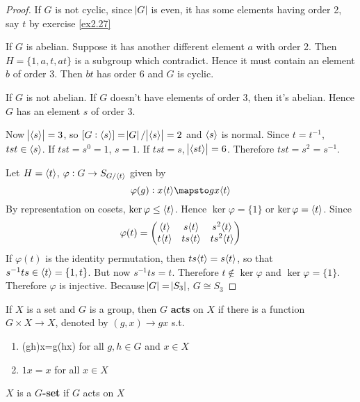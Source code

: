 \documentclass[11pt]{article}
\begin{document}
\begin{proof}


If \(G\) is not cyclic, since \(\abs{G}\) is even, it has some elements having
order 2, say \(t\) by exercise \ref{ex2.27}

If \(G\) is abelian. Suppose it has another different element \(a\) with order 2.
Then \(H=\{1,a,t,at\}\) is a subgroup which contradict. Hence it must contain
an element \(b\) of order 3. Then \(bt\) has order 6 and \(G\) is cyclic.

If \(G\) is not abelian. If \(G\) doesn't have elements of order 3, then it's
abelian. Hence \(G\) has an element \(s\) of order 3.

Now \(\abs{\langle s\rangle}=3\), so \([G:\langle s\rangle]=\abs{G}/\abs{\langle s\rangle}=2\) and \(\langle
   s\rangle\) is normal. 
Since \(t=t^{-1}\), \(tst\in\langle s\rangle\). If \(tst=s^0=1\), \(s=1\).
If \(tst=s\), \(\abs{\langle st\rangle}=6\). Therefore \(tst=s^2=s^{-1}\).

Let \(H=\langle t\rangle\), \(\varphi:G\to S_{G/\langle t\rangle}\) given by
\begin{equation*}
\varphi(g):x\la t\ra\mapsto gx\la t\ra
\end{equation*}
By representation on cosets, \(\ker\varphi\le\langle t\rangle\). Hence
\(\ker\varphi=\{1\}\) or \(\ker\varphi=\langle t\rangle\). Since
\begin{equation*}
\varphi(t)=
\begin{pmatrix}
\langle t\rangle&s\langle t\rangle&s^2\langle t\rangle\\
t\langle t\rangle&ts\langle t\rangle&ts^2\langle t \rangle
\end{pmatrix}
\end{equation*}
If \(\varphi(t)\) is the identity permutation, then \(ts\langle t\rangle=s\langle t\rangle\), so
that \(s^{-1}ts\in\langle t\rangle=\{1,t\}\). But now \(s^{-1}ts=t\). Therefore
\(t\not\in\ker\varphi\) and \(\ker\varphi=\{1\}\). Therefore \(\varphi\) is
injective. Because \(\abs{G}=\abs{S_3}\), \(G\cong S_3\)
\end{proof}


\begin{definition}[]
If \(X\) is a set and \(G\) is a group, then \(G\) \textbf{acts} on \(X\) if there is a
function \(G\times X\to X\), denoted by \((g,x)\to gx\) s.t.
\begin{enumerate}
\item (gh)x=g(hx) for all \(g,h\in G\) and \(x\in X\)
\item \(1x=x\) for all \(x\in X\)
\end{enumerate}


\(X\) is a \textbf{\(G\)-set} if \(G\) acts on \(X\)
\end{definition}
\end{document}
